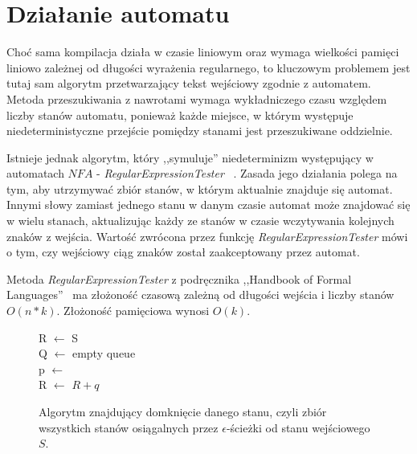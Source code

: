 \section{Działanie automatu}
\par
Choć sama kompilacja działa w czasie liniowym oraz wymaga wielkości pamięci liniowo zależnej od długości wyrażenia regularnego, to
kluczowym problemem jest tutaj sam algorytm przetwarzający tekst wejściowy zgodnie z automatem. Metoda przeszukiwania z nawrotami
wymaga wykładniczego czasu względem liczby stanów automatu, ponieważ każde miejsce, w którym występuje niedeterministyczne przejście
pomiędzy stanami jest przeszukiwane oddzielnie.
\par
Istnieje jednak algorytm, który ,,symuluje'' niedeterminizm występujący w automatach $NFA$ - \textit{RegularExpressionTester}~
\cite{FormalLanguages2}. Zasada jego działania polega na tym, aby utrzymywać zbiór stanów, w którym aktualnie
znajduje się automat. Innymi słowy zamiast jednego stanu w danym czasie automat może znajdować się w wielu stanach,
aktualizując każdy ze stanów w czasie wczytywania kolejnych znaków z wejścia. Wartość zwrócona przez funkcję
\textit{RegularExpressionTester} mówi o tym, czy wejściowy ciąg znaków został zaakceptowany przez automat.
\begin{theorem}
Metoda \textit{RegularExpressionTester} z podręcznika ,,Handbook of Formal Languages''~\cite{FormalLanguages2} ma złożoność czasową
zależną od długości wejścia i liczby stanów $O(n*k)$. Złożoność pamięciowa wynosi $O(k)$.
\end{theorem}
\begin{figure}
	\centering
	{\small
		\begin{pseudokod}[H]
		{
			R $\leftarrow$ S \\
			Q $\leftarrow$ empty queue \\
			{
			}
			{
				p $\leftarrow$  \\
				{
					{
						R $\leftarrow$ $R + {q}$ \\
					}
				}
			}
		}
		\caption{Algorytm znajdujący domknięcie danego stanu, czyli zbiór wszystkich stanów osiągalnych przez $\epsilon$-ścieżki
				od stanu wejściowego $S$.}
		\label{alg:Closure}
		\end{pseudokod}
	}
\end{figure}

